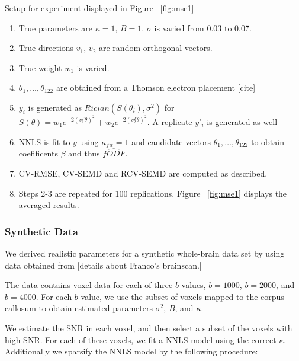 \documentclass[11pt]{article}
\begin{document}
\noindent Setup for experiment displayed in Figure ~\ref{fig:mse1}
\begin{enumerate}
\item True parameters are $\kappa=1$, $B=1$. $\sigma$ is varied from
  0.03 to 0.07.
\item True directions $v_1$, $v_2$ are random orthogonal vectors.
\item True weight $w_1$ is varied.
\item $\theta_1,\hdots,\theta_{122}$ are obtained from a Thomson electron
  placement [cite]
\item $y_i$ is generated as $Rician(S(\theta_i),\sigma^2)$ for $S(\theta) =
  w_1 e^{-2 (v_1^T \theta)^2} + w_2 e^{-2(v_2^T \theta)^2}$.  A replicate $y'_i$
    is generated as well
\item NNLS is fit to $y$ using $\kappa_{fit}=1$ and candidate vectors
  $\theta_1,\hdots,\theta_{122}$ to obtain coefificents $\beta$ and thus
  $\hat{fODF}$.
\item CV-RMSE, CV-SEMD and RCV-SEMD are computed as described.
\item Steps 2-3 are repeated for 100 replications. 
Figure ~\ref{fig:mse1} displays the averaged results.
\end{enumerate}

\subsubsection{Synthetic Data}

We derived realistic parameters for a synthetic whole-brain data set
by using data obtained from [details about Franco's brainscan.]

The data contains voxel data for each of three $b$-values, $b=1000$,
$b=2000$, and $b=4000$.
For each $b$-value, we use the subset of voxels mapped to the corpus
callosum to obtain estimated parameters $\sigma^2$, $B$, and $\kappa$.

We estimate the SNR in each voxel, and then select a subset of the
voxels with high SNR.
For each of these voxels, we fit a NNLS model using the correct $\kappa$.
Additionally we sparsify the NNLS model by the following procedure:
\end{document}
